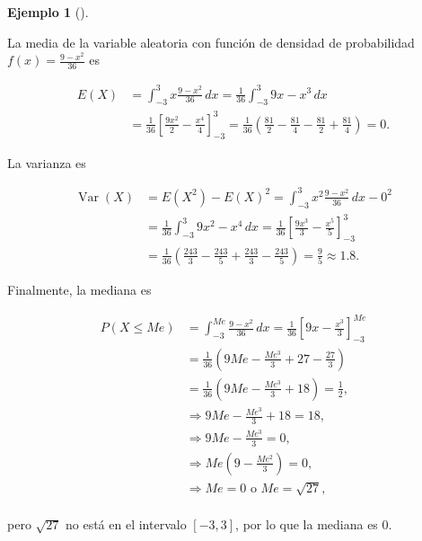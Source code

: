 \documentclass[
  a4paper,
]{scrreport}
\theoremstyle{definition}
\newtheorem{example}{Ejemplo}[chapter]
\theoremstyle{plain}
\theoremstyle{definition}
\theoremstyle{definition}
\theoremstyle{plain}
\theoremstyle{plain}
\theoremstyle{remark}
\begin{document}
\begin{example}[]\protect\hypertarget{exm-media-varianza-mediana-variable-aleatoria}{}\label{exm-media-varianza-mediana-variable-aleatoria}

La media de la variable aleatoria con función de densidad de
probabilidad \(f(x)=\frac{9-x^2}{36}\) es

\begin{align*}
E(X)
&= \int_{-3}^{3} x \frac{9-x^2}{36}\,dx
= \frac{1}{36}\int_{-3}^{3} 9x-x^3\,dx \\
&= \frac{1}{36}\left[\frac{9x^2}{2}-\frac{x^4}{4}\right]_{-3}^{3}
= \frac{1}{36}\left(\frac{81}{2}-\frac{81}{4}-\frac{81}{2}+\frac{81}{4}\right) 
= 0.
\end{align*}

La varianza es

\begin{align*}
\operatorname{Var}(X)
&= E(X^2) - E(X)^2
= \int_{-3}^{3} x^2 \frac{9-x^2}{36}\,dx - 0^2 \\
&= \frac{1}{36}\int_{-3}^{3} 9x^2-x^4\,dx
= \frac{1}{36}\left[\frac{9x^3}{3}-\frac{x^5}{5}\right]_{-3}^{3} \\
&= \frac{1}{36}\left(\frac{243}{3}-\frac{243}{5}+\frac{243}{3}-\frac{243}{5}\right)
= \frac{9}{5} 
\approx 1.8.
\end{align*}

Finalmente, la mediana es

\begin{align*}
P(X\leq Me)
&= \int_{-3}^{Me} \frac{9-x^2}{36}\,dx  
= \frac{1}{36}\left[9x-\frac{x^3}{3}\right]_{-3}^{Me} \\
&= \frac{1}{36}\left(9Me-\frac{Me^3}{3}+27-\frac{27}{3}\right) \\
&= \frac{1}{36}\left(9Me-\frac{Me^3}{3}+18\right)
= \frac{1}{2},\\
& \Rightarrow 9Me-\frac{Me^3}{3}+18 = 18,\\
& \Rightarrow 9Me-\frac{Me^3}{3} = 0,\\
& \Rightarrow Me\left(9-\frac{Me^2}{3}\right) = 0,\\
& \Rightarrow Me = 0 \mbox{ o } Me = \sqrt{27},\\
\end{align*}

pero \(\sqrt{27}\) no está en el intervalo \([-3,3]\), por lo que la
mediana es 0.

\end{example}

\end{document}
